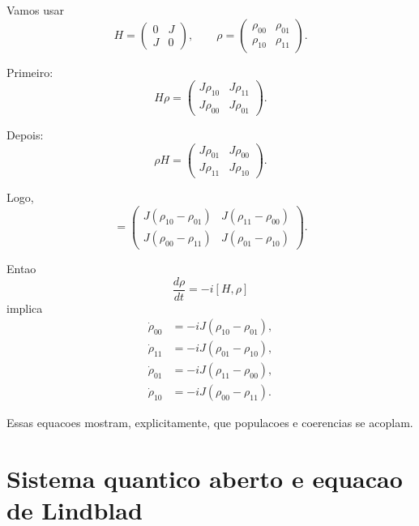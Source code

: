 \documentclass[11pt,a4paper]{article}
\begin{document}
Vamos usar
\begin{equation}
H =
\begin{pmatrix}
0 & J \\
J & 0
\end{pmatrix},
\qquad
\rho =
\begin{pmatrix}
\rho_{00} & \rho_{01} \\
\rho_{10} & \rho_{11}
\end{pmatrix}.
\end{equation}

Primeiro:
\begin{equation}
H\rho =
\begin{pmatrix}
J\rho_{10} & J\rho_{11} \\
J\rho_{00} & J\rho_{01}
\end{pmatrix}.
\end{equation}

Depois:
\begin{equation}
\rho H =
\begin{pmatrix}
J\rho_{01} & J\rho_{00} \\
J\rho_{11} & J\rho_{10}
\end{pmatrix}.
\end{equation}

Logo,
\begin{equation}
[H,\rho] =
\begin{pmatrix}
J(\rho_{10}-\rho_{01}) & J(\rho_{11}-\rho_{00}) \\
J(\rho_{00}-\rho_{11}) & J(\rho_{01}-\rho_{10})
\end{pmatrix}.
\end{equation}

Entao
\begin{equation}
\frac{d\rho}{dt} = -i[H,\rho]
\end{equation}
implica
\begin{align}
\dot{\rho}_{00} &= -iJ(\rho_{10}-\rho_{01}), \\
\dot{\rho}_{11} &= -iJ(\rho_{01}-\rho_{10}), \\
\dot{\rho}_{01} &= -iJ(\rho_{11}-\rho_{00}), \\
\dot{\rho}_{10} &= -iJ(\rho_{00}-\rho_{11}).
\end{align}

Essas equacoes mostram, explicitamente, que populacoes e coerencias se acoplam.

\section{Sistema quantico aberto e equacao de Lindblad}
\end{document}
